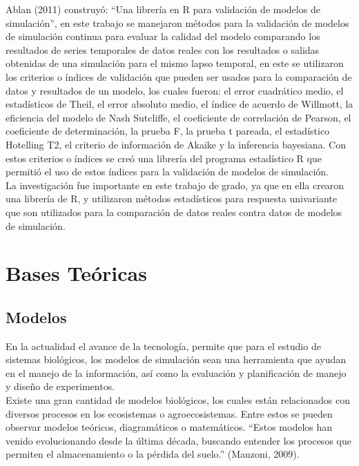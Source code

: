 Ablan (2011) construy\'o: “Una librer\'ia en R para validaci\'on de modelos de simulaci\'on”, en este trabajo se manejaron m\'etodos para la validaci\'on de modelos de simulaci\'on continua para evaluar la calidad del modelo comparando los resultados de series temporales de datos reales con los resultados o salidas obtenidas de una simulaci\'on para el mismo lapso temporal, en este se utilizaron los criterios o \'indices de validaci\'on que pueden ser usados para la comparaci\'on de datos y resultados de un modelo, los cuales fueron: el error cuadr\'atico medio, el estad\'isticos de Theil, el error absoluto medio, el \'indice de acuerdo de Willmott, la eficiencia del modelo de Nash Sutcliffe, el coeficiente de correlaci\'on de Pearson, el coeficiente de determinaci\'on, la prueba F, la prueba t pareada, el estad\'istico Hotelling T2, el criterio de informaci\'on de Akaike y la inferencia bayesiana. Con estos criterios o \'indices se cre\'o una librer\'ia del programa estad\'istico R que permiti\'o el uso de estos \'indices para la validaci\'on de modelos de simulaci\'on.\\

La investigaci\'on fue importante en este trabajo de grado, ya que en ella crearon una librer\'ia de R, y utilizaron m\'etodos estad\'isticos para respuesta univariante que son utilizados para la comparaci\'on de datos reales contra datos de modelos de simulaci\'on.\\

\section{Bases Te\'oricas}

\subsection{Modelos}

En la actualidad el avance de la tecnolog\'ia, permite que para el estudio de sistemas biol\'ogicos,  los modelos de simulaci\'on sean una herramienta que ayudan en el manejo de la informaci\'on, as\'i como la evaluaci\'on y planificaci\'on de manejo y dise\~no de experimentos.\\

Existe una gran cantidad de modelos biol\'ogicos, los cuales est\'an relacionados con diversos procesos en los ecosistemas o agroecosistemas. Entre estos se pueden observar modelos te\'oricos, diagram\'aticos o matem\'aticos. “Estos modelos han venido evolucionando desde la \'ultima d\'ecada, buscando entender los procesos que permiten el almacenamiento o la p\'erdida del suelo.” (Manzoni, 2009).\\

